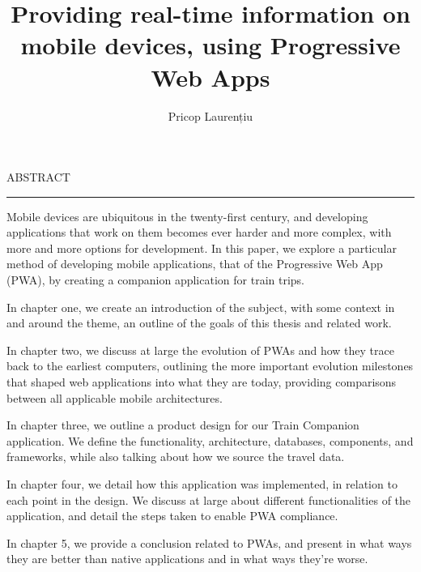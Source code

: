 \documentclass[12pt]{report}
\begin{document}
\title{Providing real-time information on mobile devices, using Progressive Web Apps}
\author{Pricop Laurențiu}

\maketitle

\newpage
\thispagestyle{empty}
\mbox{}
\newpage
{}

\cleardoublepage
ABSTRACT
\vspace{0.5cm}
\hrule
\vspace{0.5cm}

Mobile devices are ubiquitous in the twenty-first century, and developing applications that work on them becomes ever harder and more complex, with more and more options for development. In this paper, we explore a particular method of developing mobile applications, that of the Progressive Web App (PWA), by creating a companion application for train trips.

In chapter one, we create an introduction of the subject, with some context in and around the theme, an outline of the goals of this thesis and related work.

In chapter two, we discuss at large the evolution of PWAs and how they trace back to the earliest computers, outlining the more important evolution milestones that shaped web applications into what they are today, providing comparisons between all applicable mobile architectures.

In chapter three, we outline a product design for our Train Companion application. We define the functionality, architecture, databases, components, and frameworks, while also talking about how we source the travel data.

In chapter four, we detail how this application was implemented, in relation to each point in the design. We discuss at large about different functionalities of the application, and detail the steps taken to enable PWA compliance.

In chapter 5, we provide a conclusion related to PWAs, and present in what ways they are better than native applications and in what ways they're worse.

\tableofcontents


\newpage
{}









% 

\end{document}
